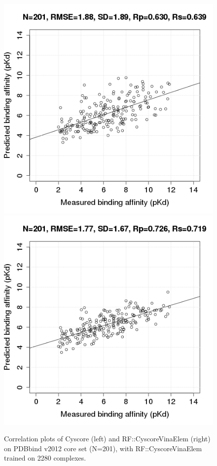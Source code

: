\documentclass[journal=jacsat,manuscript=article]{achemso}
\begin{document}
\begin{figure}
\includegraphics[width=1.4\linewidth,natwidth=480,natheight=480]{../rfcyscore/x4/mlr/trn-247-tst-201-yp.png}
\endminipage\hfill
{}
\includegraphics[width=1.4\linewidth,natwidth=480,natheight=480]{../rfcyscore/x46/rf/trn-2280-tst-201-yp.png}
\endminipage\hfill
\caption{Correlation plots of Cyscore (left) and RF::CyscoreVinaElem (right) on PDBbind v2012 core set (N=201), with RF::CyscoreVinaElem trained on 2280 complexes.}
\label{fig:tst201}
\end{figure}
\end{document}
